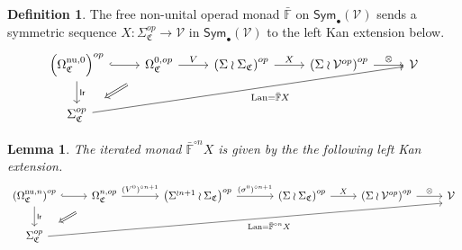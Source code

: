 \documentclass[a4paper,10pt
,draft
]{article}%
\numberwithin{equation}{section}
\numberwithin{figure}{section}
\newtheorem{lemma}[equation]{Lemma}%
\theoremstyle{definition} %
\newtheorem{definition}[equation]{Definition}%
\newcommand{\Sym}{\ensuremath{\mathsf{Sym}}}%
\DeclareMathOperator{\Lan}{Lan}%
\newcommand{\V}{\ensuremath{\mathcal V}}
\newcommand{\1}{\ensuremath{\mathbbm 1}}%
\begin{document}
\begin{definition}
      The free non-unital operad monad $\bar{\mathbb F}$ on $\Sym_\bullet(\V)$
      sends a symmetric sequence $X \colon \Sigma_{\mathfrak C}^{op} \to \V$ in $\Sym_{\bullet}(\V)$ to the left Kan extension below.
      \[
            \begin{tikzcd}
                  \left(\Omega_{\mathfrak C}^{\text{nu},0}\right)^{op} \arrow[r, hookrightarrow] \arrow[d, "\mathsf{lr}"]
                  &
                  \Omega_{\mathfrak C}^{0,op} \arrow[r,"V"] \arrow[dl, Rightarrow,shorten >=0.4cm,shorten <=0.4cm]
                  &
                  \left(\Sigma \wr \Sigma_{\mathfrak C}\right)^{op} \arrow[r, "X"] 
                  &
                  \left(\Sigma \wr \V^{op}\right)^{op} \arrow[r, "\otimes"]
                  &
                  \V
                  \\
                  \Sigma_{\mathfrak C}^{op} \arrow[urrrr, "\Lan = \bar{\mathbb F} X"']
            \end{tikzcd}
      \]
\end{definition}
\begin{lemma}
      The iterated monad $\bar{\mathbb F}^{\circ n}X$ is given by the the following left Kan extension.
      \begin{equation}
            \label{FREENUOP_EQ}
            \begin{tikzcd}
                  \left(\Omega_{\mathfrak C}^{\text{nu},n}\right)^{op} \arrow[r, hookrightarrow] \arrow[d, "\mathsf{lr}"]
                  &
                  \Omega_{\mathfrak C}^{n,op} \arrow[r,"{(V^0)^{\circ n+1}}"]
                  \arrow[dl, Rightarrow, shorten >=0.4cm,shorten <=0.4cm]
                  &[10pt]
                  \left(\Sigma ^{\wr n+1} \wr \Sigma_{\mathfrak C}\right)^{op} \arrow[r, "{(\sigma^0)^{\circ n+1}}"]
                  &[10pt]
                  \left(\Sigma \wr \Sigma_{\mathfrak C}\right)^{op} \arrow[r, "X"]
                  &
                  \left(\Sigma \wr \V^{op}\right)^{op} \arrow[r, "\otimes"]
                  &
                  \V
                  \\
                  \Sigma_{\mathfrak C}^{op} \arrow[urrrrr, start anchor = east, end anchor = south west, "\Lan = \bar{\mathbb F}^{\circ n} X"']
            \end{tikzcd}
      \end{equation}
\end{lemma}
\end{document}
